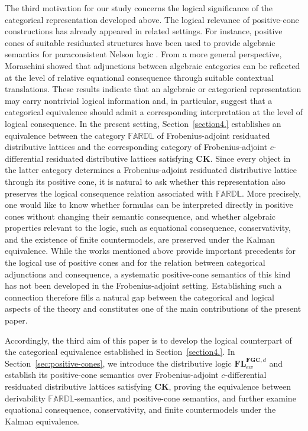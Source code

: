 \documentclass[final,12pt,times]{elsarticle}
\theoremstyle{plain}
\theoremstyle{definition}
\theoremstyle{break}
\begin{document}
The third motivation for our study concerns the logical significance of the categorical representation developed above. The logical relevance of positive-cone constructions has already appeared in related settings. For instance, positive cones of suitable residuated structures have been used to provide algebraic semantics for paraconsistent Nelson logic \cite{BusanicheCignoli2009}. From a more general perspective, Moraschini \cite{Moraschini2018} showed that adjunctions between algebraic categories can be reflected at the level of relative equational consequence through suitable contextual translations. These results indicate that an algebraic or categorical representation may carry nontrivial logical information and, in particular, suggest that a categorical equivalence should admit a corresponding interpretation at the level of logical consequence. In the present setting, Section~\ref{section4.} establishes an equivalence between the category $\mathbb{FARDL}$ of Frobenius-adjoint residuated distributive lattices and the corresponding category of Frobenius-adjoint $c$-differential residuated distributive lattices satisfying $\mathbf{CK}$. Since every object in the latter category determines a Frobenius-adjoint residuated distributive lattice through its positive cone, it is natural to ask whether this representation also preserves the logical consequence relation associated with $\mathbb{FARDL}$. More precisely, one would like to know whether formulas can be interpreted directly in positive cones without changing their semantic consequence, and whether algebraic properties relevant to the logic, such as equational consequence, conservativity, and the existence of finite countermodels, are preserved under the Kalman equivalence. While the works mentioned above provide important precedents for the logical use of positive cones and for the relation between categorical adjunctions and consequence, a systematic positive-cone semantics of this kind has not been developed in the Frobenius-adjoint setting. Establishing such a connection therefore fills a natural gap between the categorical and logical aspects of the theory and constitutes one of the main contributions of the present paper.

Accordingly, the third aim of this paper is to develop the logical counterpart of the categorical equivalence established in Section~\ref{section4.}. In Section~\ref{sec:positive-cones}, we introduce the distributive logic $\mathbf{FL}^{\mathbf{FGC},d}_{ew}$ and establish its positive-cone semantics over Frobenius-adjoint $c$-differential residuated distributive lattices satisfying $\mathbf{CK}$, proving the equivalence between derivability $\mathbb{FARDL}$-semantics, and positive-cone semantics, and further examine equational consequence, conservativity, and finite countermodels under the Kalman equivalence.
\end{document}
